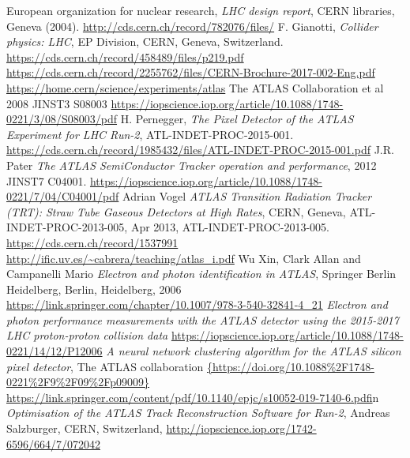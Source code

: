 \documentclass[a4paper, oneside]{book}
\begin{document}
	\begin{thebibliography}{10}
			 European organization for nuclear research, \textit{LHC design report}, CERN libraries, Geneva (2004). \url{http://cds.cern.ch/record/782076/files/}
			 F. Gianotti, \textit{Collider physics: LHC}, EP Division, CERN, Geneva, Switzerland. \url{https://cds.cern.ch/record/458489/files/p219.pdf}
			 \url{https://cds.cern.ch/record/2255762/files/CERN-Brochure-2017-002-Eng.pdf}
			 \url{https://home.cern/science/experiments/atlas}
			  The ATLAS Collaboration et al 2008 JINST3 S08003
			\url{https://iopscience.iop.org/article/10.1088/1748-0221/3/08/S08003/pdf}
			 H. Pernegger, \textit{The Pixel Detector of the ATLAS Experiment for LHC Run-2}, ATL-INDET-PROC-2015-001. \url{https://cds.cern.ch/record/1985432/files/ATL-INDET-PROC-2015-001.pdf}
			 J.R. Pater \textit{The ATLAS SemiConductor Tracker operation and performance}, 2012 JINST7 C04001. \url{https://iopscience.iop.org/article/10.1088/1748-0221/7/04/C04001/pdf}
			 Adrian Vogel \textit{ATLAS Transition Radiation Tracker (TRT): Straw Tube Gaseous Detectors at High Rates}, CERN,
			Geneva, ATL-INDET-PROC-2013-005, Apr 2013, ATL-INDET-PROC-2013-005. \url{https://cds.cern.ch/record/1537991}
			\url{http://ific.uv.es/~cabrera/teaching/atlas_i.pdf}
			 Wu Xin, Clark Allan and Campanelli Mario \textit{Electron and photon identification in ATLAS}, Springer Berlin Heidelberg, Berlin, Heidelberg, 2006
			\url{https://link.springer.com/chapter/10.1007/978-3-540-32841-4_21} 
			\textit{Electron and photon performance measurements with the {ATLAS} detector using the 2015-2017 {LHC} proton-proton collision data}
			\url{https://iopscience.iop.org/article/10.1088/1748-0221/14/12/P12006}
			 \textit{A neural network clustering algorithm for the ATLAS silicon pixel detector}, The ATLAS collaboration
			\url{{https://doi.org/10.1088%2F1748-0221%2F9%2F09%2Fp09009}}
			\url{https://link.springer.com/content/pdf/10.1140/epjc/s10052-019-7140-6.pdf}in
			 \textit{Optimisation of the ATLAS Track Reconstruction Software for Run-2}, Andreas Salzburger, CERN, Switzerland, \url{http://iopscience.iop.org/1742-6596/664/7/072042}
	\end{thebibliography}
\end{document}
